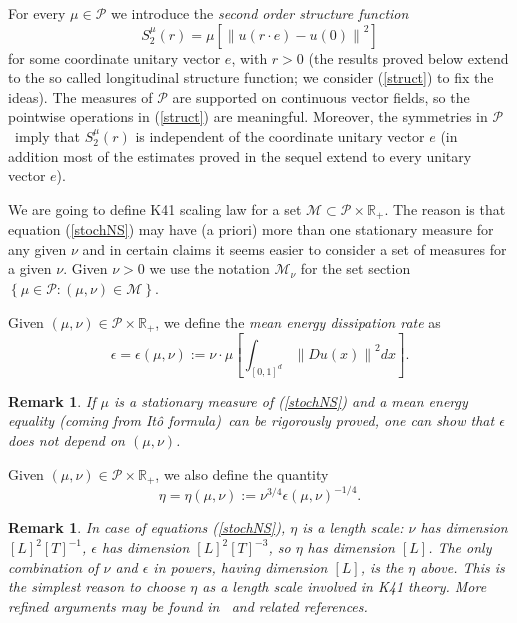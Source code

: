 \documentclass[11pt]{preprint}
\newtheorem{remark}[theorem]{Remark}
\begin{document}
For every $\mu\in\mathcal{P}$ we introduce the \textit{second order structure
function}
\begin{equation}
S_{2}^{\mu}\left(  r\right)  =\mu\left[  \left\|  u\left(  r\cdot e\right)
-u\left(  0\right)  \right\|  ^{2}\right] \label{struct}%
\end{equation}
for some coordinate unitary vector $e$, with $r>0$ (the results proved below
extend to the so called longitudinal structure function; we consider
(\ref{struct}) to fix the ideas). The measures of $\mathcal{P}$ are supported
on continuous vector fields, so the pointwise operations in (\ref{struct}) are
meaningful. Moreover, the symmetries in
$\mathcal{P}$\ imply that $S_{2}^{\mu}\left(  r\right)  $ is independent of
the coordinate unitary vector $e$ (in addition most of the estimates proved in
the sequel extend to every unitary vector $e$).

We are going to define K41 scaling law for a set $\mathcal{M}\subset
\mathcal{P}\times\mathbb{R}_{+}$. The reason is that equation (\ref{stochNS})
may have (a priori) more than one stationary measure for any given $\nu$ and
in certain claims it seems easier to consider a set of measures for a given
$\nu$. Given $\nu>0$ we use the notation $\mathcal{M}_{\nu}$ for the set
section $\left\{  \mu\in\mathcal{P}:\left(  \mu,\nu\right)  \in\mathcal{M}%
\right\}  $.

Given $\left(  \mu,\nu\right)  \in\mathcal{P}\times\mathbb{R}_{+}$, we define
the \textit{mean energy dissipation rate} as
\[
\epsilon=\epsilon\left(  \mu,\nu\right)  :=\nu\cdot\mu\left[  \int_{\left[
0,1\right]  ^{d}}\left\|  Du\left(  x\right)  \right\|  ^{2}dx\right]  .
\]

\begin{remark}
If $\mu$ is a stationary measure of (\ref{stochNS}) and a mean energy
\textit{equality} (coming from It\^{o} formula)\ can be rigorously proved, one
can show that $\epsilon$ does not depend on $\left(  \mu,\nu\right)  $.
\end{remark}

\bigskip Given $\left(  \mu,\nu\right)  \in\mathcal{P}\times\mathbb{R}_{+}$,
we also define the quantity
\[
\eta=\eta\left(  \mu,\nu\right)  :=\nu^{3/4}\epsilon\left(  \mu,\nu\right)
^{-1/4}.
\]

\begin{remark}
In case of equations (\ref{stochNS}), $\eta$ is a length scale: $\nu$ has
dimension $\left[  L\right]  ^{2}\left[  T\right]  ^{-1}$, $\epsilon$ has
dimension $\left[  L\right]  ^{2}\left[  T\right]  ^{-3}$, so $\eta$ has
dimension $\left[  L\right]  $. The only combination of $\nu$ and $\epsilon$
in powers, having dimension $\left[  L\right]  $, is the $\eta$ above. This is
the simplest reason to choose $\eta$ as a length scale involved in K41 theory.
More refined arguments may be found in~\cite{Frisch} and related references.
\end{remark}
\end{document}
